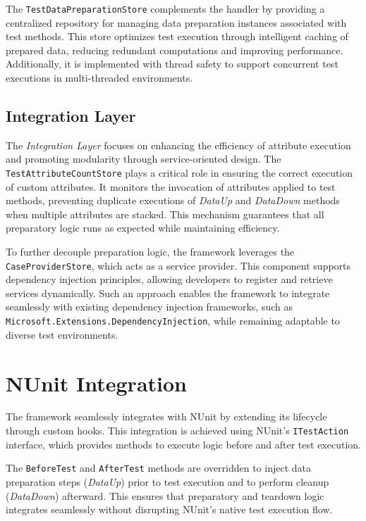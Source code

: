 The \texttt{TestDataPreparationStore} complements the handler by providing a centralized repository for managing data preparation instances associated with test methods. This store optimizes test execution through intelligent caching of prepared data, reducing redundant computations and improving performance. Additionally, it is implemented with thread safety to support concurrent test executions in multi-threaded environments.

\subsection{Integration Layer}
The \textit{Integration Layer} focuses on enhancing the efficiency of attribute execution and promoting modularity through service-oriented design. 
The \texttt{TestAttributeCountStore} plays a critical role in ensuring the correct execution of custom attributes. It monitors the invocation of attributes applied to test methods, preventing duplicate executions of \textit{DataUp} and \textit{DataDown} methods when multiple attributes are stacked. This mechanism guarantees that all preparatory logic runs as expected while maintaining efficiency.

To further decouple preparation logic, the framework leverages the \texttt{CaseProviderStore}, which acts as a service provider. This component supports dependency injection principles, allowing developers to register and retrieve services dynamically. Such an approach enables the framework to integrate seamlessly with existing dependency injection frameworks, such as \texttt{Microsoft.Extensions.DependencyInjection}, while remaining adaptable to diverse test environments.

\section{NUnit Integration}
The framework seamlessly integrates with NUnit by extending its lifecycle through custom hooks. This integration is achieved using NUnit's \texttt{ITestAction} interface, which provides methods to execute logic before and after test execution.

The \texttt{BeforeTest} and \texttt{AfterTest} methods are overridden to inject data preparation steps (\textit{DataUp}) prior to test execution and to perform cleanup (\textit{DataDown}) afterward. This ensures that preparatory and teardown logic integrates seamlessly without disrupting NUnit’s native test execution flow. 

